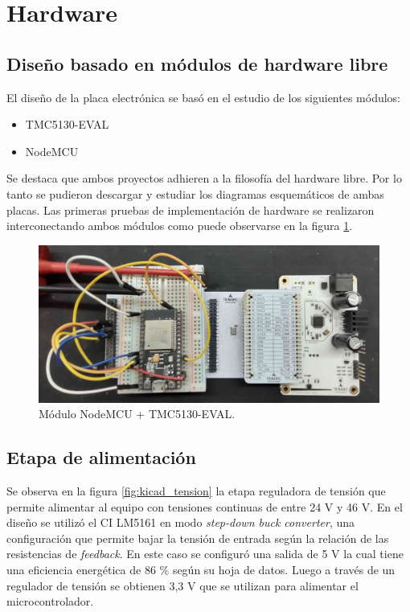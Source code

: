 \section{Hardware}
\label{section:Hardware}
\subsection{Diseño basado en módulos de hardware libre}
\label{subsection:Diseño basado en módulos de hardware libre}

El diseño de la placa electrónica se basó en el estudio de los siguientes módulos:
\begin{itemize}
\item TMC5130-EVAL \citep{3_web_trinamic_placa}	
\item NodeMCU \citep{web_nodemcu}
\end{itemize}
Se destaca que ambos proyectos adhieren a la filosofía del hardware libre. Por lo tanto se pudieron descargar y estudiar los diagramas esquemáticos de ambas placas. Las primeras pruebas de implementación de hardware se realizaron interconectando ambos módulos como puede observarse en la figura \ref{fig:esp_tmc5130}.

\begin{figure}[!h]
	\centering
	\includegraphics[width=1\textwidth]{./Figures/esp_tmc5130_v2.jpg}
	\caption{Módulo NodeMCU + TMC5130-EVAL.}
	\label{fig:esp_tmc5130}
\end{figure}

\subsection{Etapa de alimentación}

Se observa en la figura \ref{fig:kicad_tension} la etapa reguladora de tensión que permite alimentar al equipo con tensiones continuas de entre 24 V y 46 V. En el diseño se utilizó el CI LM5161 en modo \textit{step-down buck converter}, una configuración que permite bajar la tensión de entrada según la relación de las resistencias de \textit{feedback}. En este caso se configuró una salida de 5 V la cual tiene una eficiencia energética de 86 \% según su hoja de datos. Luego a través de un regulador de tensión se obtienen 3,3 V que se utilizan para alimentar el microcontrolador.

